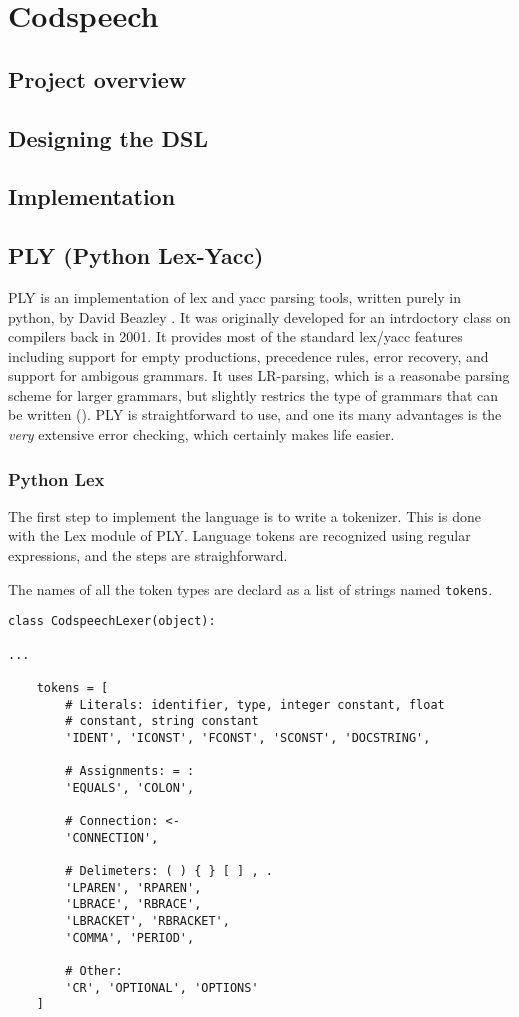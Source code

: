 \chapter{Codspeech}

\section{Project overview}


\section{Designing the DSL}


\section{Implementation}


\section{PLY (Python Lex-Yacc)}
PLY is an implementation of lex and yacc parsing tools, written purely
in python, by David Beazley \citep{ply:online}. It was originally
developed for an intrdoctory class on compilers back in 2001. It
provides most of the standard lex/yacc features including support for
empty productions, precedence rules, error recovery, and support for
ambigous grammars. It uses LR-parsing, which is a reasonabe parsing
scheme for larger grammars, but slightly restrics the type of grammars
that can be written (). PLY is
straightforward to use, and one its many advantages is the \emph{very}
extensive error checking, which certainly makes life easier.

\subsection{Python Lex}
The first step to implement the language is to write a tokenizer. This
is done with the Lex module of PLY. Language tokens are recognized
using regular expressions, and the steps are straighforward.

The names of all the token types are declard as a list of strings
named \texttt{tokens}.
\begin{lstlisting}
class CodspeechLexer(object):

...

    tokens = [
        # Literals: identifier, type, integer constant, float
        # constant, string constant
        'IDENT', 'ICONST', 'FCONST', 'SCONST', 'DOCSTRING',

        # Assignments: = :
        'EQUALS', 'COLON',

        # Connection: <-
        'CONNECTION',

        # Delimeters: ( ) { } [ ] , .
        'LPAREN', 'RPAREN',
        'LBRACE', 'RBRACE',
        'LBRACKET', 'RBRACKET',
        'COMMA', 'PERIOD',

        # Other:
        'CR', 'OPTIONAL', 'OPTIONS'
    ]
\end{lstlisting}

